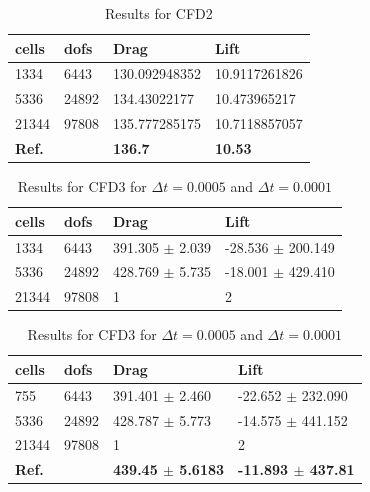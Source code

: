 \begin{table}[!ht]
\begin{center}
  \begin{tabular}{|l | l | l | l|} \hline
	cells & dofs & Drag & Lift \\ \hline
    1334  & 6443 & 130.092948352 & 10.9117261826 \\   \hline
    5336 & 24892& 134.43022177 & 10.473965217 \\ \hline
    21344 & 97808& 135.777285175 & 10.7118857057 \\ \hline \hline
    \textbf{Ref.}  & & \textbf{136.7} & \textbf{10.53} \\ \hline 
    \hline
  \end{tabular}
\end{center}
\caption{Results for CFD2}
\end{table}
\begin{table}[!ht]
\begin{center}
	\begin{tabular}{|l | l | l | l|} \hline
	cells & dofs & Drag & Lift \\ \hline
    1334  & 6443& 391.305 $\pm$ 2.039 & -28.536 $\pm$ 200.149\\   \hline
    5336 & 24892  & 428.769 $\pm$ 5.735 & -18.001 $\pm$ 429.410 \\ \hline
    21344 & 97808& 1 & 2   \\ \hline \hline
    \hline
  \end{tabular}
  \begin{tabular}{|l | l | l | l|} \hline
	cells & dofs & Drag & Lift \\ \hline
    755  & 6443  &  391.401 $\pm$ 2.460  & -22.652 $\pm$ 232.090\\   \hline
    5336 & 24892 & 428.787 $\pm$ 5.773 & -14.575 $\pm$ 441.152 \\ \hline
    21344 & 97808& 1 & 2   \\ \hline \hline
    \textbf{Ref.}  & & \textbf{439.45 $\pm$ 5.6183} & \textbf{-11.893 $\pm$ 437.81} \\ \hline 
    \hline
  \end{tabular}
\end{center}
\caption{Results for CFD3 for $\Delta t = 0.0005$ and $\Delta t = 0.0001$} 
\end{table}

